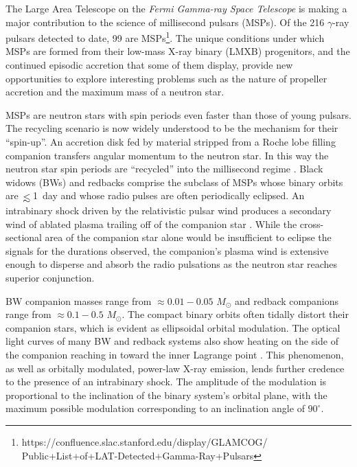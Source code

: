 \documentclass[iop]{emulateapj}
\def\simle{\,\hbox{\hbox{$ < $}\kern -0.8em \lower 1.0ex\hbox{$\sim$}}\,}
\begin{document}
The Large Area Telescope on the {\it Fermi Gamma-ray Space Telescope}
is making a major contribution to the science of millisecond pulsars (MSPs).
Of the 216 $\gamma$-ray pulsars detected to date, 99 are MSPs\footnote{https://confluence.slac.stanford.edu/display/GLAMCOG/\\Public+List+of+LAT-Detected+Gamma-Ray+Pulsars}.
The unique conditions under which MSPs are formed from their
low-mass X-ray binary (LMXB) progenitors, and the continued episodic accretion
that some of them display, provide new opportunities to explore interesting
problems such as the nature of propeller accretion and the maximum mass of
a neutron star.

MSPs are neutron stars with spin periods even faster than those of young pulsars.
The recycling scenario is now widely understood to be the mechanism for their ``spin-up''.
An accretion disk fed by material stripped from a Roche lobe filling companion
transfers angular momentum to the neutron star.  In this way the neutron star spin
periods are ``recycled'' into the millisecond regime \citep{alp82}.  Black widows
(BWs) and redbacks comprise the subclass of MSPs whose binary orbits are $\simle$1~day and
whose radio pulses are often periodically
eclipsed. An intrabinary shock driven by the relativistic pulsar wind produces a
secondary wind of ablated plasma trailing off of the companion star \citep{phi88}.
While the cross-sectional area of the companion star alone would be insufficient to
eclipse the signals for the durations observed, the companion's plasma wind is
extensive enough to disperse and absorb
the radio pulsations as the neutron star reaches superior conjunction.

BW companion masses range from $\approx0.01-0.05$ $M_{\odot}$ and redback companions range
from $\approx0.1-0.5$ $M_{\odot}$. The compact binary orbits often tidally distort
their companion stars, which is evident as ellipsoidal orbital modulation.
The optical light curves of many BW and redback systems also
show heating on the side of the companion reaching in toward the inner
Lagrange point \citep{rom11,kon12,bre13,gen14,bog11,bog14a,bog14b}. This phenomenon,
as well as orbitally modulated, power-law X-ray emission,
lends further credence to the presence of an intrabinary shock. The amplitude of the
modulation is proportional to the inclination of the binary system's orbital plane,
with the maximum possible modulation
corresponding to an inclination angle of $90^{\circ}$.
\end{document}
